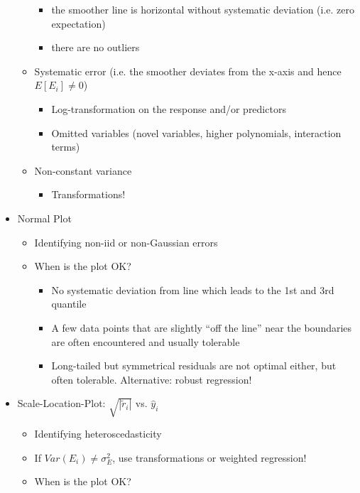 \documentclass[a4paper]{article}
\begin{document}
\begin{itemize}
\begin{itemize}
\begin{itemize}
            \item the smoother line is horizontal without systematic deviation (i.e. zero expectation)
            \item there are no outliers
        \end{itemize}
        \item Systematic error (i.e. the smoother deviates from the x-axis and hence $E[E_i]\neq0$)
        \begin{itemize}
            \item Log-transformation on the response and/or predictors
            \item Omitted variables (novel variables, higher polynomials, interaction terms)
        \end{itemize}
        \item Non-constant variance
        \begin{itemize}
            \item Transformations!
        \end{itemize}
    \end{itemize}
    \item Normal Plot
    \begin{itemize}
        \item Identifying non-iid or non-Gaussian errors
        \item When is the plot OK?
        \begin{itemize}
            \item No systematic deviation from line which leads to the 1st and 3rd quantile
            \item A few data points that are slightly ``off the line'' near the boundaries are often encountered and usually tolerable
            \item Long-tailed but symmetrical residuals are not optimal either, but often tolerable. Alternative: robust regression!
        \end{itemize}
    \end{itemize}
    \item Scale-Location-Plot: $\sqrt{|\tilde{r}_i|}$ vs. $\hat{y}_i$
    \begin{itemize}
        \item Identifying heteroscedasticity
        \item If $Var(E_i)\neq\sigma_E^2$, use transformations or weighted regression!
        \item When is the plot OK?
        \begin{itemize}

\end{itemize}
\end{itemize}
\end{itemize}
\end{document}
